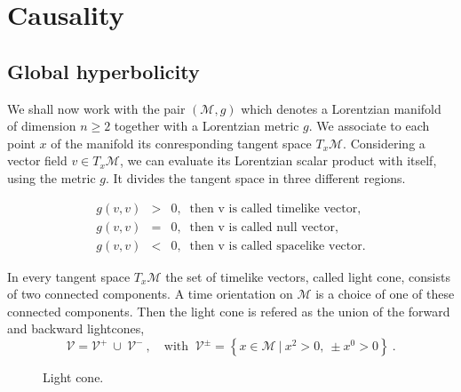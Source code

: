\documentclass[12pt]{book}
\newcommand{\Mcal}{\mathcal{M}}
\newcommand{\Vcal}{\mathcal{V}}
\theoremstyle{break}
\begin{document}
\section{Causality}


\subsection{Global hyperbolicity}


We shall now work with the pair $(\Mcal,g)$ which denotes a Lorentzian manifold of dimension $n \geq 2$ together with a Lorentzian metric $g$. We associate to each point $x$ of the manifold its conresponding tangent space $T_x\Mcal$. Considering a vector field $v \in T_x\Mcal$, we can evaluate its Lorentzian scalar product with itself, using the metric $g$. It divides the tangent space in three different regions.


\begin{eqnarray*}
g(v,v) &>& 0 , \ \mbox{ then v is called timelike vector}, \\ 
g(v,v) &=& 0 , \ \mbox{ then v is called null vector}, \\ 
g(v,v) &<& 0 , \ \mbox{ then v is called spacelike vector}.
\end{eqnarray*}


In every tangent space $T_x\Mcal$ the set of timelike vectors, called light cone, consists of two connected components. A time orientation on $\Mcal$ is a choice of one of these connected components. Then the light cone is refered as the union of the forward and backward lightcones, 
%
\begin{equation*}
\Vcal=\Vcal^{+} \ \cup \ \Vcal^{-} \ , \quad \mbox{with } \ \Vcal^{\pm}=\left\{ x\in\Mcal \ | \ x^{2}>0, \ \pm x^{0}>0 \right\} \ . 
\end{equation*}


\begin{figure}[ht!]
%
\begin{center}
%
%
\end{center}
%
\caption{Light cone.}
%
\end{figure}
\end{document}
